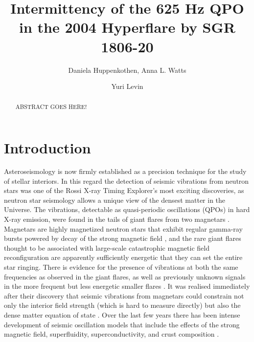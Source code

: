 \documentclass{emulateapj}
\begin{document}
\title{Intermittency of the 625 Hz QPO in the 2004 Hyperflare by SGR 1806-20}
\author{Daniela Huppenkothen, Anna L. Watts}
\author{Yuri Levin}

\begin{abstract}
ABSTRACT GOES HERE!
\end{abstract} 

\section{Introduction}
\label{sec:introduction}
Asteroseismology is now firmly established as a precision technique for the study of stellar interiors. In this regard the detection of seismic vibrations from neutron stars was one of the Rossi X-ray Timing Explorer's most exciting discoveries, as neutron star seismology allows a unique view of the densest matter in the Universe. The vibrations, detectable as quasi-periodic oscillations (QPOs) in hard X-ray emission, were found in the tails of giant flares from two magnetars \citep{Israel05, Strohmayer05, Strohmayer06, Watts06}. Magnetars are highly magnetized neutron stars that exhibit regular gamma-ray bursts powered by decay of the strong magnetic field \citep{Thompson95}, and the rare giant flares thought to be associated with large-scale catastrophic magnetic field reconfiguration are apparently sufficiently energetic that they can set the entire star ringing. There is evidence for the presence of vibrations at both the same frequencies as observed in the giant flares, as well as previously unknown signals in the more frequent but less energetic smaller flares \citep{Huppenkothen13, Huppenkothen14}. It was realised immediately after their discovery that seismic vibrations from magnetars could constrain not only the interior field strength (which is hard to measure directly) but also the dense matter equation of state \citep{Samuelsson07,Watts07}. Over the last few years there has been intense development of seismic oscillation models that include the effects of the strong magnetic field, superfluidity, superconductivity, and crust composition \citep{Levin06,Levin07,Glampedakis06,Sotani2008,Andersson09,Steiner09,vanHoven11,vanHoven12, Colaiuda11,Gabler12, Gabler13, Passamonti13a, Passamonti13b}.   
\end{document}
